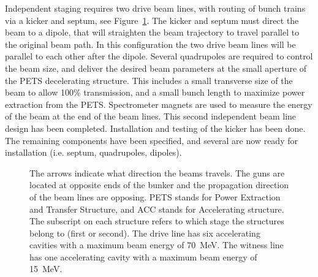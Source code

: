 \label{chp:4}%



Independent staging requires two drive beam lines, with routing of bunch trains via a kicker and septum, 
see Figure~\ref{fig:full-staging}. The kicker and septum must direct the beam to a dipole, 
that will straighten the beam trajectory to travel parallel to the original beam path. 
In this configuration the two drive beam lines will be parallel to each other after the dipole.
Several quadrupoles are required to control the beam size, and deliver the desired beam parameters
at the small aperture of the PETS decelerating structure. 
This includes a small transverse size of the beam to allow 100\% transmission, 
and a small bunch length to maximize power extraction from the PETS.
Spectrometer magnets are used to measure the energy of the beam at the end of the beam lines.
This second independent beam line design has been completed. 
Installation and testing of the kicker has been done.  
The remaining components have been specified, and several are now ready for installation (i.e. septum, quadrupoles, dipoles).
\begin{figure}
		\begin{center}
		\begin{tikzpicture}[scale=\textwidth/35cm, text=black]
		
		\end{tikzpicture}
	\end{center}
\caption{The arrows indicate what direction the beams travels.
	The guns are located at opposite ends of the bunker and 
	the propagation direction of the beam lines are opposing.
	PETS stands for Power Extraction and Transfer Structure, and ACC stands for Accelerating structure. 
	The subscript on each structure refers to which stage the structures belong to (first or second). 
	The drive line has six accelerating cavities with a maximum beam energy of \SI{70}{MeV}. 
	The witness line has one accelerating cavity with a maximum beam energy of \SI{15}{MeV}.}
\label{fig:full-staging}
\end{figure}

